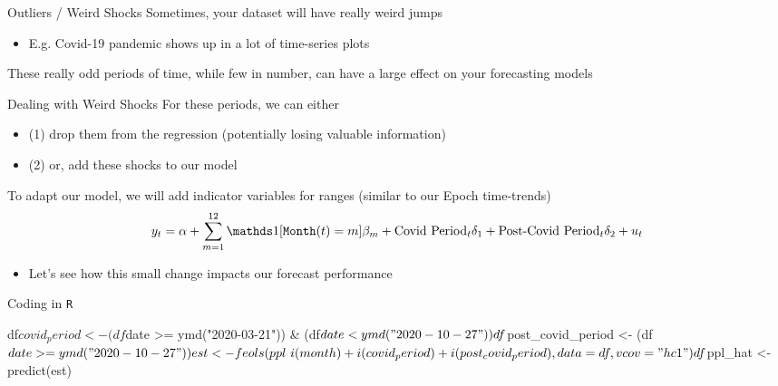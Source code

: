 \documentclass[aspectratio=169,t,11pt,table]{beamer}
\begin{document}
\begin{frame}{Outliers / Weird Shocks}
  Sometimes, your dataset will have really weird jumps
  \begin{itemize}
    \item E.g. Covid-19 pandemic shows up in a lot of time-series plots
  \end{itemize}

  \bigskip
  These really odd periods of time, while few in number, can have a large effect on your forecasting models
\end{frame}


\begin{frame}{Dealing with Weird Shocks}
  For these periods, we can either
  \begin{itemize}
    \item (1) drop them from the regression (potentially losing valuable information)
    
    \item (2) or, add these shocks to our model
  \end{itemize}

  \pause
  \bigskip
  To adapt our model, we will add indicator variables for ranges (similar to our Epoch time-trends)
  $$
    y_t = \alpha + \sum_{m = 1}^{12} \one{\texttt{Month}(t) = m} \beta_m + \text{Covid Period}_t \delta_1 + \text{Post-Covid Period}_t \delta_2 + u_t
  $$
  
  \begin{itemize}
    \item Let's see how this small change impacts our forecast performance
  \end{itemize}
\end{frame}


\begin{frame}[fragile]{Coding in \texttt{R}}
  \begin{codeblock}
df$covid_period <- (df$date >= ymd("2020-03-21")) & 
  (df$date < ymd("2020-10-27"))
df$post_covid_period <- (df$date >= ymd("2020-10-27"))

est <- feols(
  ppl ~ i(month) + i(covid_period) + i(post_covid_period),
  data = df, vcov = "hc1"
)
df$ppl_hat <- predict(est)
  \end{codeblock}
\end{frame}
\end{document}
